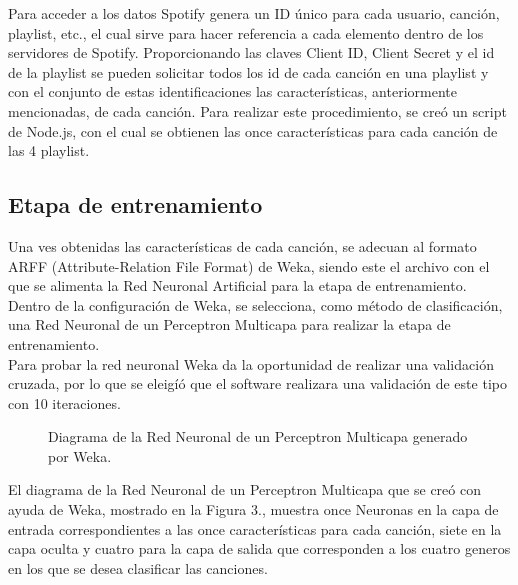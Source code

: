 \documentclass[conference]{IEEEtran}
\begin{document}
Para acceder a los datos Spotify genera un ID único para cada usuario, canción, playlist, etc., el cual sirve para hacer referencia a cada elemento dentro de los servidores de Spotify. Proporcionando las claves Client ID, Client Secret y el id de la playlist se pueden solicitar todos los id de cada canción en una playlist y con el conjunto de estas identificaciones las características, anteriormente mencionadas, de cada canción. Para realizar este procedimiento, se creó un script de Node.js, con el cual se obtienen las once características para cada canción de las 4 playlist.\\

\subsection{Etapa de entrenamiento}
Una ves obtenidas las características de cada canción, se adecuan al formato ARFF (Attribute-Relation File Format) de Weka, siendo este el archivo con el que se alimenta la Red Neuronal Artificial para la etapa de entrenamiento.\\
Dentro de la configuración de Weka, se selecciona, como método de clasificación, una Red Neuronal de un Perceptron Multicapa para realizar la etapa de entrenamiento.\\

Para probar la red neuronal Weka da la oportunidad de realizar una validación cruzada, por lo que se eleigíó que el software realizara una validación de este tipo con 10 iteraciones.\\

\begin{figure}[htbp]
	\centering
	\caption{ Diagrama de la Red Neuronal de un Perceptron Multicapa generado por Weka. }
\end{figure}

El diagrama de la Red Neuronal de un Perceptron Multicapa que se creó con ayuda de Weka, mostrado en la Figura 3., muestra once Neuronas en la capa de entrada correspondientes a las once características para cada canción, siete en la capa oculta y cuatro para la capa de salida que corresponden a los cuatro generos en los que se desea clasificar las canciones.
\end{document}
